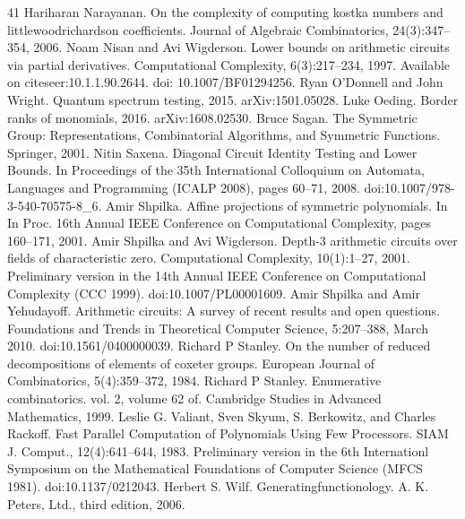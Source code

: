 \begin{thebibliography}{41}
 Hariharan Narayanan. On the complexity of computing kostka numbers and littlewoodrichardson coefficients. Journal of Algebraic Combinatorics, 24(3):347–354, 2006.
 Noam Nisan and Avi Wigderson. Lower bounds on arithmetic circuits via partial derivatives. Computational Complexity, 6(3):217–234, 1997. Available on citeseer:10.1.1.90.2644. doi: 10.1007/BF01294256.
 Ryan O’Donnell and John Wright. Quantum spectrum testing, 2015. arXiv:1501.05028.
 Luke Oeding. Border ranks of monomials, 2016. arXiv:1608.02530.
 Bruce Sagan. The Symmetric Group: Representations, Combinatorial Algorithms, and Symmetric Functions. Springer, 2001.
 Nitin Saxena. Diagonal Circuit Identity Testing and Lower Bounds. In Proceedings of the 35th International Colloquium on Automata, Languages and Programming (ICALP 2008), pages 60–71, 2008. doi:10.1007/978-3-540-70575-8\_6.
 Amir Shpilka. Affine projections of symmetric polynomials. In In Proc. 16th Annual IEEE Conference on Computational Complexity, pages 160–171, 2001.
 Amir Shpilka and Avi Wigderson. Depth-3 arithmetic circuits over fields of characteristic zero. Computational Complexity, 10(1):1–27, 2001. Preliminary version in the 14th Annual IEEE Conference on Computational Complexity (CCC 1999). doi:10.1007/PL00001609.
 Amir Shpilka and Amir Yehudayoff. Arithmetic circuits: A survey of recent results and open questions. Foundations and Trends in Theoretical Computer Science, 5:207–388, March 2010. doi:10.1561/0400000039.
 Richard P Stanley. On the number of reduced decompositions of elements of coxeter groups. European Journal of Combinatorics, 5(4):359–372, 1984.
 Richard P Stanley. Enumerative combinatorics. vol. 2, volume 62 of. Cambridge Studies in Advanced Mathematics, 1999.
 Leslie G. Valiant, Sven Skyum, S. Berkowitz, and Charles Rackoff. Fast Parallel Computation of Polynomials Using Few Processors. SIAM J. Comput., 12(4):641–644, 1983. Preliminary version in the 6th Internationl Symposium on the Mathematical Foundations of Computer Science (MFCS 1981). doi:10.1137/0212043.
 Herbert S. Wilf. Generatingfunctionology. A. K. Peters, Ltd., third edition, 2006.
\end{thebibliography}
